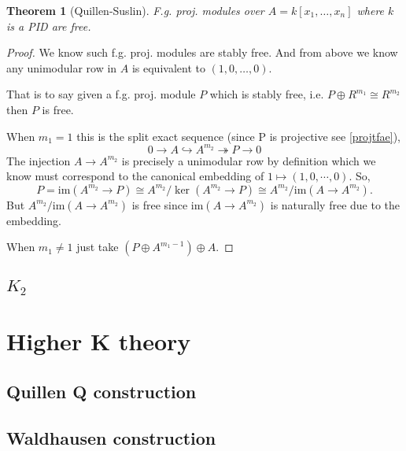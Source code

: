 \documentclass[12pt]{article}
\numberwithin{equation}{section}
\newtheorem{theorem}{Theorem}[section]
\begin{document}
	
	
	\begin{theorem}[Quillen-Suslin]
		F.g. proj. modules over $A=k[x_1,\dots,x_n]$ where $k$ is a PID are free.
	\end{theorem}
	\begin{proof}
		We know such f.g. proj. modules are stably free. And from above we know any unimodular row in $A$ is equivalent to $(1,0,\dots,0)$.
		
		That is to say given a f.g. proj. module $P$ which is stably free, i.e. $P \oplus R^{m_1} \cong R^{m_2}$ then $P$ is free.
		
		When $m_1=1$ this is the split exact sequence (since P is projective see \ref{projtfae}),
		\[ 0 \to A \hookrightarrow A^{m_2}  \twoheadrightarrow P \to 0 \]
		The injection $A \to A^{m_2}$ is precisely a unimodular row by definition which we know must correspond to the canonical embedding of $1 \mapsto (1,0,\cdots, 0)$.
		So,$$P = \mathrm{im}(A^{m_2} \to P) \cong A^{m_2}/\ker (A^{m_2} \to P) \cong A^{m_2}/\mathrm{im}(A \to A^{m_2}).$$
		But $A^{m_2}/\mathrm{im}(A \to A^{m_2})$ is free since $\mathrm{im}(A \to A^{m_2})$ is naturally free due to the embedding.
		
		When $m_1 \neq 1$ just take $(P \oplus A^{m_1-1}) \oplus A$.
	\end{proof}
	\subsection{$K_2$}
	
	\section{Higher K theory}
	\subsection{Quillen Q construction}
	\subsection{Waldhausen construction}
	
\end{document}
